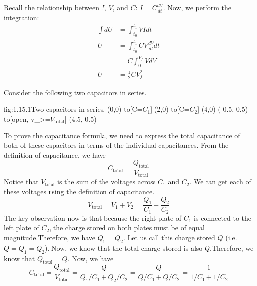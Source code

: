 \documentclass{article}
\begin{document}
    Recall the relationship between $I$, $V$, and $C$: $I = C\frac{dV}{dt}$. Now, we perform the integration:
    \begin{align*}
        \int dU &= \int_{t_0} ^{t_1} VIdt\\
        U &= \int_{t_0} ^{t_1} CV\frac{dV}{dt}dt\\
        &= C\int_0^{V_f} V dV\\
        U &= \frac{1}{2}CV_f^2
    \end{align*}

    Consider the following two capacitors in series.
    \begin{circuit}{fig:1.15.1}{Two capacitors in series.}
        (0,0) to[C=$C_1$] (2,0)
            to[C=$C_2$] (4,0)
        (-0.5,-0.5) to[open, v_>=$V_\text{total}$] (4.5,-0.5)
    \end{circuit}
    
    To prove the capacitance formula, we need to express the total capacitance of both of these capacitors in terms of the individual capacitances. From the definition of capacitance, we have 
    \[C_\text{total} = \frac{Q_\text{total}}{V_\text{total}}\]
    Notice that $V_\text{total}$ is the sum of the voltages across $C_1$ and $C_2$. We can get each of these voltages using the definition of capacitance.
    \[V_\text{total} = V_1 + V_2 = \frac{Q_1}{C_1} + \frac{Q_2}{C_2}\]
    The key observation now is that because the right plate of $C_1$ is connected to the left plate of $C_2$, the charge stored on both plates must be of equal magnitude.\footnotemark Therefore, we have $Q_1 = Q_2$. Let us call this charge stored $Q$ (i.e. $Q = Q_1 = Q_2$). Now, we know that the total charge stored is also $Q$.\footnotemark Therefore, we know that $Q_\text{total} = Q$. Now, we have 
    \[C_\text{total} = \frac{Q_\text{total}}{V_\text{total}} = \frac{Q}{Q_1/C_1 + Q_2/C_2} = \frac{Q}{Q/C_1 + Q/C_2} = \frac{1}{1/C_1 + 1/C_2}\]


\end{document}
